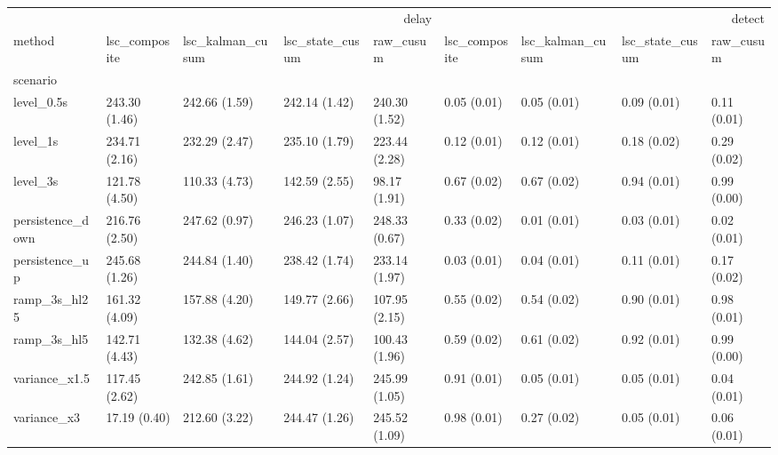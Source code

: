 \begin{tabular}{lllllllll}
\toprule
 & \multicolumn{4}{r}{delay} & \multicolumn{4}{r}{detect} \\
method & lsc_composite & lsc_kalman_cusum & lsc_state_cusum & raw_cusum & lsc_composite & lsc_kalman_cusum & lsc_state_cusum & raw_cusum \\
scenario &  &  &  &  &  &  &  &  \\
\midrule
level_0.5s & 243.30 (1.46) & 242.66 (1.59) & 242.14 (1.42) & 240.30 (1.52) & 0.05 (0.01) & 0.05 (0.01) & 0.09 (0.01) & 0.11 (0.01) \\
level_1s & 234.71 (2.16) & 232.29 (2.47) & 235.10 (1.79) & 223.44 (2.28) & 0.12 (0.01) & 0.12 (0.01) & 0.18 (0.02) & 0.29 (0.02) \\
level_3s & 121.78 (4.50) & 110.33 (4.73) & 142.59 (2.55) & 98.17 (1.91) & 0.67 (0.02) & 0.67 (0.02) & 0.94 (0.01) & 0.99 (0.00) \\
persistence_down & 216.76 (2.50) & 247.62 (0.97) & 246.23 (1.07) & 248.33 (0.67) & 0.33 (0.02) & 0.01 (0.01) & 0.03 (0.01) & 0.02 (0.01) \\
persistence_up & 245.68 (1.26) & 244.84 (1.40) & 238.42 (1.74) & 233.14 (1.97) & 0.03 (0.01) & 0.04 (0.01) & 0.11 (0.01) & 0.17 (0.02) \\
ramp_3s_hl25 & 161.32 (4.09) & 157.88 (4.20) & 149.77 (2.66) & 107.95 (2.15) & 0.55 (0.02) & 0.54 (0.02) & 0.90 (0.01) & 0.98 (0.01) \\
ramp_3s_hl5 & 142.71 (4.43) & 132.38 (4.62) & 144.04 (2.57) & 100.43 (1.96) & 0.59 (0.02) & 0.61 (0.02) & 0.92 (0.01) & 0.99 (0.00) \\
variance_x1.5 & 117.45 (2.62) & 242.85 (1.61) & 244.92 (1.24) & 245.99 (1.05) & 0.91 (0.01) & 0.05 (0.01) & 0.05 (0.01) & 0.04 (0.01) \\
variance_x3 & 17.19 (0.40) & 212.60 (3.22) & 244.47 (1.26) & 245.52 (1.09) & 0.98 (0.01) & 0.27 (0.02) & 0.05 (0.01) & 0.06 (0.01) \\
\bottomrule
\end{tabular}
